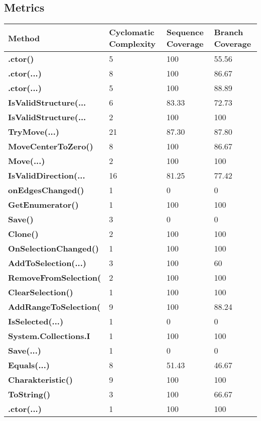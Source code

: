 \documentclass[a4paper,10pt]{article}
\begin{document}
\subsection{Metrics}
\begin{longtable}[l]{|l|l|l|l|}
\hline
\textbf{Method} & \textbf{Cyclomatic Complexity} & \textbf{Sequence Coverage} & \textbf{Branch Coverage}\\
\hline
\textbf{.ctor()} & 5 & 100 & 55.56\\
\hline
\textbf{.ctor(...)} & 8 & 100 & 86.67\\
\hline
\textbf{.ctor(...)} & 5 & 100 & 88.89\\
\hline
\textbf{IsValidStructure(...} & 6 & 83.33 & 72.73\\
\hline
\textbf{IsValidStructure(...} & 2 & 100 & 100\\
\hline
\textbf{TryMove(...)} & 21 & 87.30 & 87.80\\
\hline
\textbf{MoveCenterToZero()} & 8 & 100 & 86.67\\
\hline
\textbf{Move(...)} & 2 & 100 & 100\\
\hline
\textbf{IsValidDirection(...} & 16 & 81.25 & 77.42\\
\hline
\textbf{onEdgesChanged()} & 1 & 0 & 0\\
\hline
\textbf{GetEnumerator()} & 1 & 100 & 100\\
\hline
\textbf{Save()} & 3 & 0 & 0\\
\hline
\textbf{Clone()} & 2 & 100 & 100\\
\hline
\textbf{OnSelectionChanged()} & 1 & 100 & 100\\
\hline
\textbf{AddToSelection(...)} & 3 & 100 & 60\\
\hline
\textbf{RemoveFromSelection(} & 2 & 100 & 100\\
\hline
\textbf{ClearSelection()} & 1 & 100 & 100\\
\hline
\textbf{AddRangeToSelection(} & 9 & 100 & 88.24\\
\hline
\textbf{IsSelected(...)} & 1 & 0 & 0\\
\hline
\textbf{System.Collections.I} & 1 & 100 & 100\\
\hline
\textbf{Save(...)} & 1 & 0 & 0\\
\hline
\textbf{Equals(...)} & 8 & 51.43 & 46.67\\
\hline
\textbf{Charakteristic()} & 9 & 100 & 100\\
\hline
\textbf{ToString()} & 3 & 100 & 66.67\\
\hline
\textbf{.ctor(...)} & 1 & 100 & 100\\
\hline
\end{longtable}
\end{document}
